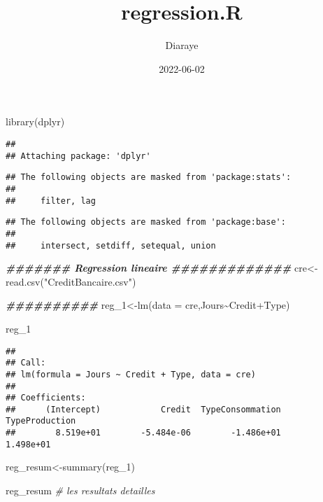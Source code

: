 \documentclass[
]{article}
\title{regression.R}
\author{Diaraye}
\date{2022-06-02}
\newenvironment{Shaded}{\begin{snugshade}}{\end{snugshade}}
\newcommand{\AttributeTok}[1]{\textcolor[rgb]{0.77,0.63,0.00}{#1}}
\newcommand{\CommentTok}[1]{\textcolor[rgb]{0.56,0.35,0.01}{\textit{#1}}}
\newcommand{\DocumentationTok}[1]{\textcolor[rgb]{0.56,0.35,0.01}{\textbf{\textit{#1}}}}
\newcommand{\FunctionTok}[1]{\textcolor[rgb]{0.00,0.00,0.00}{#1}}
\newcommand{\NormalTok}[1]{#1}
\newcommand{\OtherTok}[1]{\textcolor[rgb]{0.56,0.35,0.01}{#1}}
\newcommand{\SpecialCharTok}[1]{\textcolor[rgb]{0.00,0.00,0.00}{#1}}
\newcommand{\StringTok}[1]{\textcolor[rgb]{0.31,0.60,0.02}{#1}}
\begin{document}
\maketitle

\begin{Shaded}
\begin{Highlighting}[]
\FunctionTok{library}\NormalTok{(dplyr)}
\end{Highlighting}
\end{Shaded}

\begin{verbatim}
## 
## Attaching package: 'dplyr'
\end{verbatim}

\begin{verbatim}
## The following objects are masked from 'package:stats':
## 
##     filter, lag
\end{verbatim}

\begin{verbatim}
## The following objects are masked from 'package:base':
## 
##     intersect, setdiff, setequal, union
\end{verbatim}

\begin{Shaded}
\begin{Highlighting}[]
\DocumentationTok{\#\#\#\#\#\#\# Regression lineaire   \#\#\#\#\#\#\#\#\#\#\#\#\#}
\NormalTok{cre}\OtherTok{\textless{}{-}}\FunctionTok{read.csv}\NormalTok{(}\StringTok{"CreditBancaire.csv"}\NormalTok{)}

\DocumentationTok{\#\#\#\#\#\#\#\#\#\#}
\NormalTok{reg\_1}\OtherTok{\textless{}{-}}\FunctionTok{lm}\NormalTok{(}\AttributeTok{data =}\NormalTok{ cre,Jours}\SpecialCharTok{\textasciitilde{}}\NormalTok{Credit}\SpecialCharTok{+}\NormalTok{Type)}

\NormalTok{reg\_1}
\end{Highlighting}
\end{Shaded}

\begin{verbatim}
## 
## Call:
## lm(formula = Jours ~ Credit + Type, data = cre)
## 
## Coefficients:
##      (Intercept)            Credit  TypeConsommation    TypeProduction  
##        8.519e+01        -5.484e-06        -1.486e+01         1.498e+01
\end{verbatim}

\begin{Shaded}
\begin{Highlighting}[]
\NormalTok{reg\_resum}\OtherTok{\textless{}{-}}\FunctionTok{summary}\NormalTok{(reg\_1)}

\NormalTok{reg\_resum  }\CommentTok{\# les resultats detailles}
\end{Highlighting}
\end{Shaded}
\end{document}
